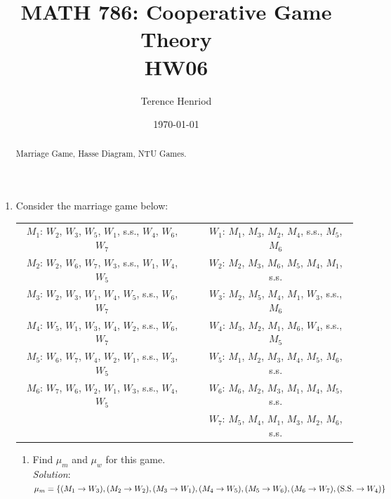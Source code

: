 \documentclass{article}
\title{MATH 786: Cooperative Game Theory \\ HW06}
\author{Terence Henriod}
\date{\today}
\begin{document}
\maketitle

\begin{abstract}
Marriage Game, Hasse Diagram, NTU Games. 
\end{abstract}

\newpage
\begin{enumerate}
\item Consider the marriage game below: \\
\begin{tabular}{ c c c }
$M_{1}$: $W_{2}$, $W_{3}$, $W_{5}$, $W_{1}$,    s.s., $W_{4}$, $W_{6}$, $W_{7}$ & \qquad
& $W_{1}$: $M_{1}$, $M_{3}$, $M_{2}$, $M_{4}$,    s.s., $M_{5}$, $M_{6}$ \\

$M_{2}$: $W_{2}$, $W_{6}$, $W_{7}$, $W_{3}$,    s.s., $W_{1}$, $W_{4}$, $W_{5}$ & \qquad
& $W_{2}$: $M_{2}$, $M_{3}$, $M_{6}$, $M_{5}$, $M_{4}$, $M_{1}$,    s.s. \\

$M_{3}$: $W_{2}$, $W_{3}$, $W_{1}$, $W_{4}$, $W_{5}$,    s.s., $W_{6}$, $W_{7}$ & \qquad
& $W_{3}$: $M_{2}$, $M_{5}$, $M_{4}$, $M_{1}$, $W_{3}$,    s.s., $M_{6}$ \\

$M_{4}$: $W_{5}$, $W_{1}$, $W_{3}$, $W_{4}$, $W_{2}$,    s.s., $W_{6}$, $W_{7}$ & \qquad
& $W_{4}$: $M_{3}$, $M_{2}$, $M_{1}$, $M_{6}$, $W_{4}$,    s.s., $M_{5}$ \\

$M_{5}$: $W_{6}$, $W_{7}$, $W_{4}$, $W_{2}$, $W_{1}$,    s.s., $W_{3}$, $W_{5}$ & \qquad
& $W_{5}$: $M_{1}$, $M_{2}$, $M_{3}$, $M_{4}$, $M_{5}$, $M_{6}$,    s.s. \\

$M_{6}$: $W_{7}$, $W_{6}$, $W_{2}$, $W_{1}$, $W_{3}$,    s.s., $W_{4}$, $W_{5}$ & \qquad
& $W_{6}$: $M_{6}$, $M_{2}$, $M_{3}$, $M_{1}$, $M_{4}$, $M_{5}$,    s.s. \\

 & \qquad
& $W_{7}$: $M_{5}$, $M_{4}$, $M_{1}$, $M_{3}$, $M_{2}$, $M_{6}$,    s.s. \\
\end{tabular}

  \begin{enumerate}
  \item Find $\mu_{m}$ and $\mu_{w}$ for this game. \\

  \textit{Solution}: \\
  $\mu_{m} = \\ \{ (M_{1} \rightarrow W_{3}),
                (M_{2} \rightarrow W_{2}),
                (M_{3} \rightarrow W_{1}),
                (M_{4} \rightarrow W_{5}),
                (M_{5} \rightarrow W_{6}),
                (M_{6} \rightarrow W_{7}),
                (\text{S.S.} \rightarrow W_{4}) \}$ \\


\end{enumerate}
\end{enumerate}
\end{document}
